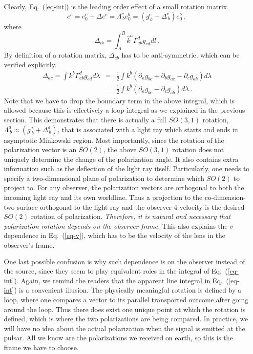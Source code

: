 \documentclass[aps,showpacs,twocolumn,floats,prd,superscriptaddress,nofootinbib]{revtex4-1}
\begin{document}
Clearly, Eq.~(\ref{eq-int}) is the leading order effect of a small rotation matrix.
\begin{equation}
e^c = e_0^c + \Delta e^c = \Lambda^c_{\ b} e_0^b = 
\left( g^c_{\ b} + \Delta^c_{\ b} \right) e_0^b~,
\end{equation}
where
\begin{equation}
\Delta_{cb} = \int_A^B \hat{k}^a \Gamma^d_{ab} g_{cd}dl~.
\end{equation}
By definition of a rotation matrix, $\Delta_{cb}$ has to be anti-symmetric, which can be verified explicitly.
\begin{eqnarray}
\Delta_{ac} = \int k^b\Gamma_{ab}^d g_{cd}d\lambda &=& 
\frac{1}{2} \int k^b \left(\partial_a g_{bc} + \partial_bg_{ac} - \partial_c g_{ab}\right)d\lambda
\label{eq-Delta} \nonumber \\
&=& \frac{1}{2} \int k^b \left(\partial_a g_{bc} - \partial_c g_{ab}\right)d\lambda~.
\end{eqnarray}
Note that we have to drop the boundary term in the above integral, which is allowed because this is effectively a loop integral as we explained in the previous section.
This demonstrates that there is actually a full $SO(3,1)$ rotation, $\Lambda^a_{\ b}\approx\left(g^a_{\ b} + \Delta^a_{\ b}\right)$, that is associated with a light ray which starts and ends in asymptotic Minkowski region. 
Most importantly, since the rotation of the polarization vector is an $SO(2)$, the above $SO(3,1)$ rotation does not uniquely determine the change of the polarization angle.
It also contains extra information such as the deflection of the light ray itself. 
Particularly, one needs to specify a two-dimensional plane of polarization to determine which $SO(2)$ to project to. 
For any observer, the polarization vectors are orthogonal to both the incoming light ray and its own worldline. 
Thus a projection to the co-dimension-two surface orthogonal to the light ray and the observer 4-velocity is the desired $SO(2)$ rotation of polarization. 
{\it Therefore, it is natural and necessary that polarization rotation depends on the observer frame.} This also explains the $v$ dependence in Eq.~(\ref{eq-v}), which has to be the velocity of the lens in the observer's frame.

One last possible confusion is why such dependence is on the observer instead of the source, since they seem to play equivalent roles in the integral of Eq.~(\ref{eq-int}). 
Again, we remind the readers that the apparent line integral in Eq.~(\ref{eq-int}) is a convenient illusion.
The physically meaningful rotation is defined by a loop, where one compares a vector to its parallel transported outcome after going around the loop.
Thus there does exist one unique point at which the rotation is defined, which is where the two polarizations are being compared. 
In practice, we will have no idea about the actual polarization when the signal is emitted at the pulsar. 
All we know are the polarizations we received on earth, so this is the frame we have to choose.
\end{document}
